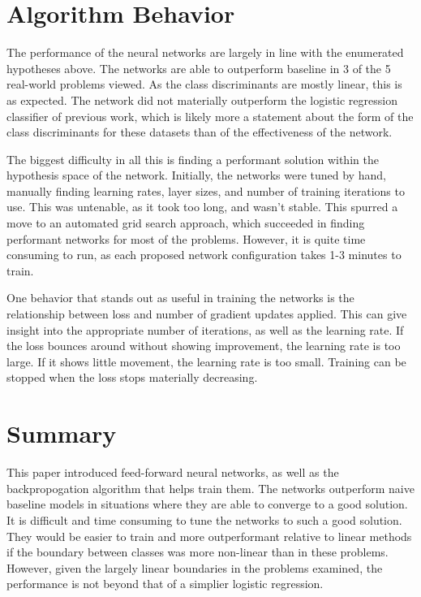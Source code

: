 \documentclass{amsart}
\begin{document}
    \section{Algorithm Behavior}
    The performance of the neural networks are largely
    in line with the enumerated hypotheses above. The networks are able to outperform
    baseline in 3 of the 5 real-world problems viewed. As the class discriminants
    are mostly linear, this is as expected. The network did not materially
    outperform the logistic regression classifier of previous work,
    which is likely more a statement about the form of the
    class discriminants for these datasets
    than of the effectiveness of the network.

    The biggest difficulty in all this is finding a performant solution within
    the hypothesis space of the network. Initially, the networks were tuned by hand,
    manually finding learning rates, layer sizes,
    and number of training iterations to use. This was untenable, as it
    took too long, and wasn't stable. This spurred a move to an automated
    grid search approach, which succeeded in finding performant
    networks for most of the problems. However, it is quite time
    consuming to run, as each proposed network configuration takes
    1-3 minutes to train.

    One behavior that stands out as useful in training the networks is the
    relationship between loss and number of gradient updates applied. This
    can give insight into the appropriate number of iterations, as well
    as the learning rate. If the loss bounces around without showing
    improvement, the learning rate is too large. If it shows little
    movement, the learning rate is too small. Training can be stopped
    when the loss stops materially decreasing.

    \section{Summary}
    This paper introduced feed-forward neural networks, as well as the
    backpropogation algorithm that helps train them.
    The networks outperform naive baseline
    models in situations where they are able to converge to a good solution.
    It is difficult and time consuming to tune the networks to such a good solution.
    They would be easier to train and more outperformant relative to linear
    methods if the boundary between classes was more non-linear than
    in these problems. However, given the largely linear boundaries in the
    problems examined, the performance is not beyond that of a simplier
    logistic regression.





\end{document}
